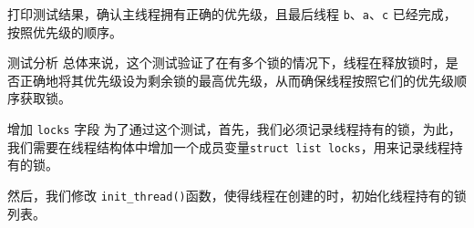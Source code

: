 \documentclass{beamer}
\begin{document}
\begin{frame}
  打印测试结果，确认主线程拥有正确的优先级，且最后线程 \texttt{b}、\texttt{a}、\texttt{c} 已经完成，按照优先级的顺序。

  \begin{block}{测试分析}
    总体来说，这个测试验证了在有多个锁的情况下，线程在释放锁时，是否正确地将其优先级设为剩余锁的最高优先级，从而确保线程按照它们的优先级顺序获取锁。
  \end{block}

  \framebreak

  \begin{block}{增加 \texttt{locks} 字段}
    为了通过这个测试，首先，我们必须记录线程持有的锁，为此，我们需要在线程结构体中增加一个成员变量\texttt{struct list locks}，用来记录线程持有的锁。
  \end{block}








  然后，我们修改 \texttt{init\_thread()}函数，使得线程在创建的时，初始化线程持有的锁列表。



\end{frame}
\end{document}
